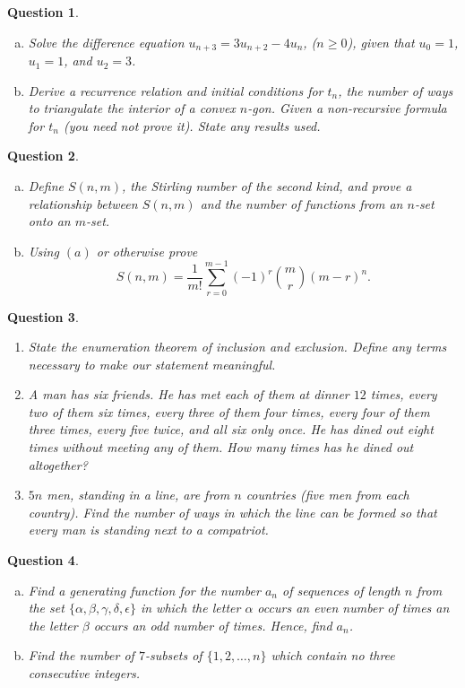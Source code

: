 \documentclass[12]{article}
\newtheorem{question}{Question}
\theoremstyle{definition}
\begin{document}
	\begin{question}
		\
		\begin{enumerate}[a)]
			\item Solve the difference equation $u_{n+3} = 3u_{n+2}-4u_n$, ($n \geq 0$), given that $u_0 = 1$, $u_1 = 1$, and $u_2 = 3$.
			\item Derive a recurrence relation and initial conditions for $t_n$, the number of ways to triangulate the interior of a convex $n$-gon.  Given a non-recursive formula for $t_n$ (you need not prove it).  State any results used.
		\end{enumerate}
	\end{question}

	\begin{question}
		\
		\begin{enumerate}[a)]
			\item Define $S(n,m)$, the Stirling number of the second kind, and prove a relationship between $S(n,m)$ and the number of functions from an $n$-set onto an $m$-set.
			\item Using $(a)$ or otherwise prove
			$$S(n,m) = \frac{1}{m!} \sum_{r=0}^{m-1}(-1)^r {m \choose r}(m-r)^n.$$
		\end{enumerate}
	\end{question}
	
	\begin{question}
		\
		\begin{enumerate}
			\item State the enumeration theorem of inclusion and exclusion.  Define any terms necessary to make our statement meaningful.
			\item A man has six friends.  He has met each of them at dinner $12$ times, every two of them six times, every three of them four times, every four of them three times, every five twice, and all six only once.  He has dined out eight times without meeting any of them.  How many times has he dined out altogether?
			\item $5n$ men, standing in a line, are from $n$ countries (five men from each country).  Find the number of ways in which the line can be formed so that every man is standing next to a compatriot.
		\end{enumerate}
	\end{question}

	\begin{question}
		\
		\begin{enumerate}[a)]
			\item Find a generating function for the number $a_n$ of sequences of length $n$ from the set $\{\alpha, \beta, \gamma, \delta, \epsilon\}$ in which the letter $\alpha$ occurs an even number of times an the letter $\beta$ occurs an odd number of times.  Hence, find $a_n$.
			\item Find the number of $7$-subsets of $\{1, 2, \ldots, n\}$ which contain no three consecutive integers.
		\end{enumerate}
	\end{question}
\end{document}
